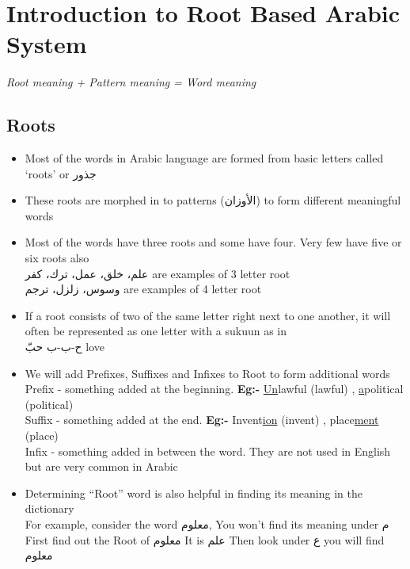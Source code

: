\chapter{Introduction to Root Based Arabic System}


\textit{Root meaning + Pattern meaning = Word meaning}

\section{Roots}
\begin{itemize}	    \setlength{\itemsep}{5pt}
	\item Most of the words in Arabic language are formed from basic letters called `roots' or \textarabic{جذور}
	\item These roots are morphed in to patterns (\textarabic{الأوزان}) to form different meaningful words
	\item Most of the words have three roots and some have four. Very few have five or six roots also \\
	\textarabic{علم، خلق، عمل، ترك، كفر} are examples of 3 letter root \\
	\textarabic{وسوس، زلزل، ترجم} are examples of 4 letter root
	
	\item  If a root consists of two of the same letter right next to one another, it will often be represented as one letter with a \textarabic{sukuun} as in\\
		\textarabic{ح-ب-ب} \qquad \textarabic{حبّ} \qquad love
	
	\item We will add Prefixes, Suffixes and
	Infixes to Root to form additional
	words \\
	
	Prefix - something added at the beginning. \textbf{Eg:-}
	\underline{Un}lawful (lawful) , \underline{a}political (political) \\
	Suffix - something added at the end. \textbf{Eg:-}
	Invent\underline{ion} (invent) , place\underline{ment} 	(place) \\
	Infix - something added in 	between the word. 
	They are not used in English but are very common in Arabic
	
	
	 

	
	
	\item Determining “Root” word is also helpful
	in finding its meaning in the dictionary \\
	For example, consider the word \textarabic{معلوم}, You won’t find its meaning under \textarabic{م} \\
	First find out the Root of \textarabic{معلوم} It is \textarabic{علم}
	Then look under \textarabic{ع} you will find \textarabic{معلوم}
	
	
\end{itemize}
